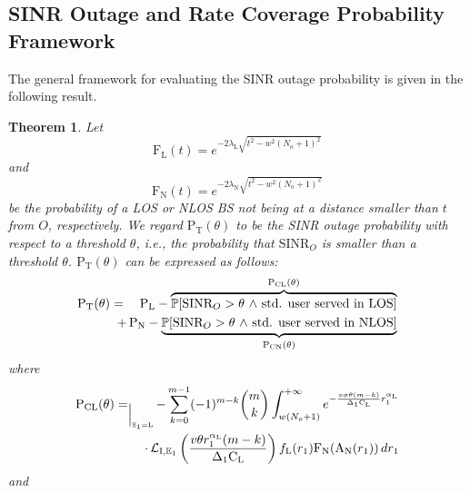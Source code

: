 \documentclass[10pt,journal,a4paper]{IEEEtran}
\newtheorem{theorem}{Theorem}[section]
\begin{document}
\subsection{SINR Outage and Rate Coverage Probability Framework}
The general framework for evaluating the SINR outage probability is given in the following result.
\begin{theorem}\label{th.SINRout}
Let
\begin{equation}
\mathrm{F}_\mathrm{L}(t) = e^{-2 \lambda_\mathrm{L} \sqrt{t^2-w^2(N_o+1)^2}}
\end{equation}
and
\begin{equation}
\mathrm{F}_\mathrm{N}(t) = e^{-2 \lambda_\mathrm{N} \sqrt{t^2-w^2(N_o+1)^2}}\label{eq.FN}
\end{equation}
be the probability of a LOS or NLOS BS not being at a distance smaller than $t$ from $O$, respectively. We regard $\mathrm{P}_\mathrm{T}(\theta)$ to be the SINR outage probability with respect to a threshold $\theta$, i.e., the probability that $\mathrm{SINR}_O$ is smaller than a threshold $\theta$. $\mathrm{P}_\mathrm{T}(\theta)$ can be expressed as follows:
\setlength{\arraycolsep}{0.0em} 
\begin{eqnarray}
\mathrm{P}_\mathrm{T}(\theta) &{}={}& \mathrm{P}_{\mathrm{L}} - \overbrace{\mathbb{P}[\textrm{SINR}_O > \theta \,\,\text{$\land$}\,\, \text{std. user served in LOS}]}^{\mathrm{P}_\mathrm{CL}(\theta)}\nonumber\\
 &&\hspace{-13mm} +\,\mathrm{P}_{\mathrm{N}} - \underbrace{\mathbb{P}[\textrm{SINR}_O > \theta \,\,\text{$\land$}\,\, \text{std. user served in NLOS}]}_{\mathrm{P}_\mathrm{CN}(\theta)}\label{eq.sinrOut.Th}
\end{eqnarray}
where
\setlength{\arraycolsep}{0.0em}
\begin{eqnarray}
\mathrm{P}_\mathrm{CL}(\theta) &{}=_{\Big|_{\mathbb{E}_1 = \mathrm{L}}}{}& \hspace*{-4mm}-\sum_{k = 0}^{m-1}(-1)^{m-k}\binom{m}{k}\int_{w(N_o+1)}^{+\infty} e^{-\frac{v\sigma\theta(m-k)}{\Delta_1 \mathrm{C}_\mathrm{L}}r_1^{\alpha_\mathrm{L}}}\notag\\
&& \hspace{-13mm}\cdot \, \mathcal{L}_\mathrm{I,\mathbb{E}_1}\left(\frac{v\theta r_1^{\alpha_{\mathrm{L}}}(m-k)}{\Delta_1 \mathrm{C}_\mathrm{L}}\right) f_\mathrm{L}(r_1) \mathrm{F}_\mathrm{N}(\mathrm{A}_\mathrm{N}(r_1)) \, d r_1\label{eq.PCL}
\end{eqnarray}
and
\setlength{\arraycolsep}{0.0em} 

\end{theorem}
\end{document}

